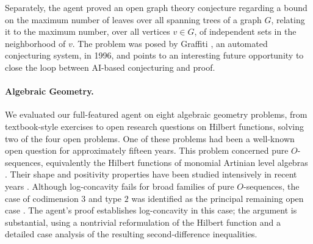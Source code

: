 Separately, the agent proved an open graph theory conjecture regarding a bound on the maximum number of leaves over all spanning trees of a graph $G$, relating it to the maximum number, over all vertices $v \in G$, of independent sets in the neighborhood of $v$. The problem was posed by Graffiti \cite{Graffiti}, an automated conjecturing system, in 1996, and points to an interesting future opportunity to close the loop between AI-based conjecturing and proof. 


\paragraph{Algebraic Geometry.} 
We evaluated our full-featured agent on eight algebraic geometry problems, from textbook-style exercises to open research questions on Hilbert functions, solving two of the four open problems. One of these problems had been a well-known open question for approximately fifteen years. This problem concerned pure
$O$-sequences, equivalently the Hilbert functions of monomial Artinian level
algebras \cite{Stanley1978}.  Their shape and positivity properties have
been studied intensively in recent years \cite{BMMNZ2012}.  Although
log-concavity fails for broad families of pure $O$-sequences, the case of codimension $3$ and type $2$ was identified as the principal remaining
open case \cite{Zanello2024}.  The agent's proof establishes log-concavity in
this case; the argument is substantial, using a nontrivial
reformulation of the Hilbert function and a detailed case analysis of the
resulting second-difference inequalities.

